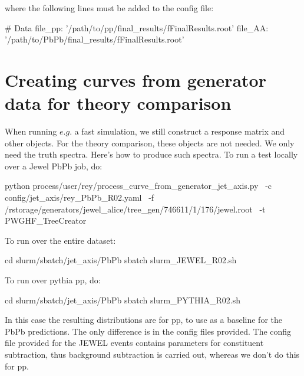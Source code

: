 \documentclass[12pt]{article}
\begin{document}
where the following lines must be added to the config file:
\begin{tcolorbox}
\begin{verbnobox}[\scriptsize]
# Data
file_pp: '/path/to/pp/final_results/fFinalResults.root'
file_AA: '/path/to/PbPb/final_results/fFinalResults.root'
\end{verbnobox}  
\end{tcolorbox}

\section{Creating curves from generator data for theory comparison}

When running $e.g.$ a fast simulation, we still construct a response matrix and other objects. For the theory comparison, these objects are not needed.
We only need the truth spectra. Here's how to produce such spectra. To run a test locally over a Jewel PbPb job, do:

\begin{tcolorbox}
\begin{verbnobox}[\scriptsize]
python process/user/rey/process_curve_from_generator_jet_axis.py \
-c config/jet_axis/rey_PbPb_R02.yaml \
-f /rstorage/generators/jewel_alice/tree_gen/746611/1/176/jewel.root \
-t PWGHF_TreeCreator
\end{verbnobox}  
\end{tcolorbox}

To run over the entire dataset:
\begin{tcolorbox}
\begin{verbnobox}[\scriptsize]
cd slurm/sbatch/jet_axis/PbPb
sbatch slurm_JEWEL_R02.sh
\end{verbnobox}  
\end{tcolorbox}

To run over pythia pp, do:
\begin{tcolorbox}
\begin{verbnobox}[\scriptsize]
cd slurm/sbatch/jet_axis/PbPb
sbatch slurm_PYTHIA_R02.sh
\end{verbnobox}  
\end{tcolorbox}

In this case the resulting distributions are for pp, to use as a baseline for the PbPb predictions. The only difference is in the config files provided.
The config file provided for the JEWEL events contains parameters for constituent subtraction, thus background subtraction is carried out, whereas we don't do this for pp.
\end{document}
